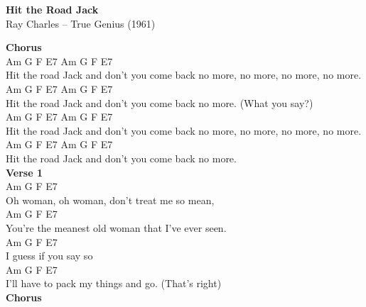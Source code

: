 \documentclass[a4paper]{article}
\begin{document}
    \begin{center}
        \textbf{Hit the Road Jack}
        ~\\
        Ray Charles -- True Genius (1961)
    \end{center}
    {
        \scriptsize
        \textbf{Chorus}
        ~\\
        {
            \cutive
            \obeyspaces
        Am   G       F               E7   Am       G        F        E7
\\
Hit the road Jack and don't you come back no more, no more, no more, no more.
\\
        Am   G       F               E7      Am  G F E7
\\
Hit the road Jack and don't you come back no more. (What you say?)
\\
        Am   G       F               E7   Am       G        F        E7
\\
Hit the road Jack and don't you come back no more, no more, no more, no more.
\\
        Am   G       F               E7      Am  G F E7
\\
Hit the road Jack and don't you come back no more.
\\

        }
        \textbf{Verse 1}
        ~\\
        {
            \cutive
            \obeyspaces
   Am        G            F           E7
\\
Oh woman, oh woman, don't treat me so mean,
\\
           Am          G               F    E7
\\
You're the meanest old woman that I've ever seen.
\\
  Am       G       F  E7
\\
I guess if you say so
\\
     Am              G          F           E7
\\
I'll have to pack my things and go. (That's right)
\\

        }
        \textbf{Chorus}
        ~\\
        {
            \cutive
            \obeyspaces

}}
\end{document}
